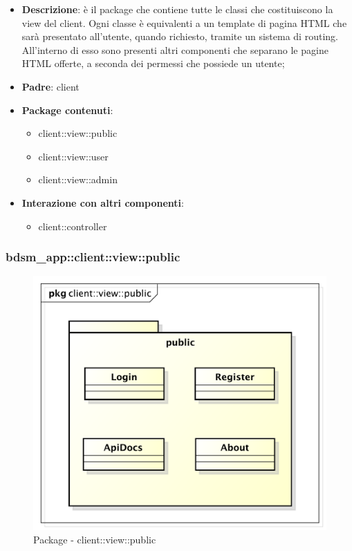 \begin{itemize}
	\item \textbf{Descrizione}: è il package che contiene tutte le classi che costituiscono la view del client. Ogni classe è equivalenti a un template di pagina HTML che sarà presentato all'utente, quando richiesto, tramite un sistema di routing. \newline
	All'interno di esso sono presenti altri componenti che separano le pagine HTML offerte, a seconda dei permessi che possiede un utente;
	\item \textbf{Padre}: client
	\item \textbf{Package contenuti}:
		\begin{itemize}
			\item client::view::public
			\item client::view::user
			\item client::view::admin
		\end{itemize}
	\item \textbf{Interazione con altri componenti}:
		\begin{itemize}
			\item client::controller
		\end{itemize}
\end{itemize}

\pagebreak

\subsubsection{bdsm\_app::client::view::public} %
\label{ssub:bdsm_app_client_view_public}
\begin{figure}[htbp]
	\centering
	\centerline{\includegraphics[scale=0.6]{./images/client/client_view_public.pdf}}
	\caption{Package - client::view::public}
\end{figure}


